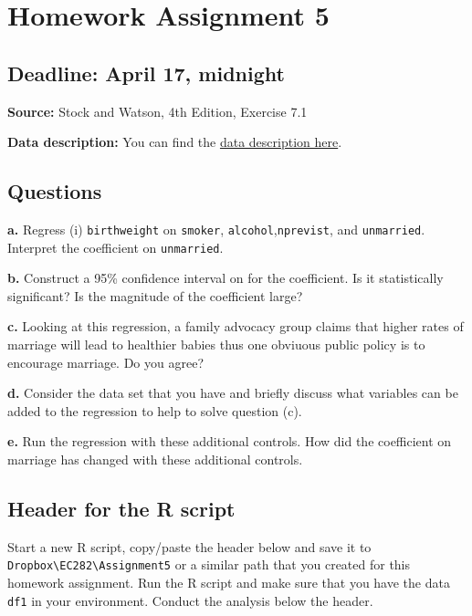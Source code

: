 \documentclass[
]{article}
\author{}
\date{}
\begin{document}
\hypertarget{homework-assignment-5}{%
\section{Homework Assignment 5}\label{homework-assignment-5}}

\hypertarget{deadline-april-17-midnight}{%
\subsection{Deadline: April 17,
midnight}\label{deadline-april-17-midnight}}

\textbf{Source:} Stock and Watson, 4th Edition, Exercise 7.1

\textbf{Data description:} You can find the
\href{https://www.dropbox.com/s/s0q564v6lplbexu/Birthweight_Smoking_Description.pdf?dl=1}{data
description here}.

\hypertarget{questions}{%
\subsection{Questions}\label{questions}}

\textbf{a.} Regress (i) \texttt{birthweight} on \texttt{smoker},
\texttt{alcohol},\texttt{nprevist}, and \texttt{unmarried}. Interpret
the coefficient on \texttt{unmarried}.

\textbf{b.} Construct a 95\% confidence interval on for the coefficient.
Is it statistically significant? Is the magnitude of the coefficient
large?

\textbf{c.} Looking at this regression, a family advocacy group claims
that higher rates of marriage will lead to healthier babies thus one
obviuous public policy is to encourage marriage. Do you agree?

\textbf{d.} Consider the data set that you have and briefly discuss what
variables can be added to the regression to help to solve question (c).

\textbf{e.} Run the regression with these additional controls. How did
the coefficient on marriage has changed with these additional controls.

\hypertarget{header-for-the-r-script}{%
\subsection{Header for the R script}\label{header-for-the-r-script}}

Start a new R script, copy/paste the header below and save it to
\texttt{Dropbox\textbackslash{}EC282\textbackslash{}Assignment5} or a
similar path that you created for this homework assignment. Run the R
script and make sure that you have the data \texttt{df1} in your
environment. Conduct the analysis below the header.
\end{document}
